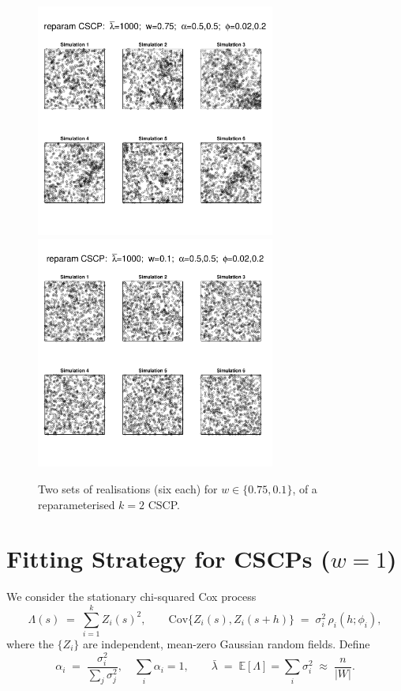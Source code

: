 \documentclass[11pt]{article}
\begin{document}
\begin{figure}
	\includegraphics[width=0.7\textwidth]{fig_repam_wsmaller1.pdf}\\
	\includegraphics[width=0.7\textwidth]{fig_repam_wsmaller2.pdf}\\
	\caption{Two sets of realisations (six each) for $w\in\{0.75,0.1\}$, of a reparameterised $k=2$ CSCP.}\label{fig:smallerw}
\end{figure}


\section{Fitting Strategy for CSCPs (\(w=1\))}

We consider the stationary chi-squared Cox process
\[
\Lambda(s) \;=\; \sum_{i=1}^k Z_i(s)^2,
\qquad 
\mathrm{Cov}\{Z_i(s),Z_i(s+h)\} \;=\; \sigma_i^2 \,\rho_i(h;\phi_i),
\]
where the $\{Z_i\}$ are independent, mean-zero Gaussian random fields.  
Define
\[
\alpha_i \;=\; \frac{\sigma_i^2}{\sum_j\sigma_j^2}, \quad 
\sum_i \alpha_i = 1, 
\qquad 
\bar\lambda \;=\; \mathbb E[\Lambda] = \sum_i \sigma_i^2 \;\approx\; \frac{n}{|W|}.
\]
\end{document}
